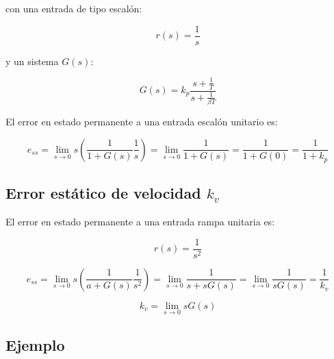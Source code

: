             con una entrada de tipo escalón:

            \begin{equation*}
                r(s) = \frac{1}{s}
            \end{equation*}

            y un sistema $G(s)$:

            \begin{equation*}
                G(s) = k_p \frac{s + \frac{1}{T}}{s + \frac{1}{\beta T}}
            \end{equation*}

            El error en estado permanente a una entrada escalón unitario es:

            \begin{equation*}
                e_{ss} = \lim_{s \to 0} s \left( \frac{1}{1 + G(s)} \frac{1}{s} \right) = \lim_{s \to 0} \frac{1}{1 + G(s)} = \frac{1}{1 + G(0)} = \frac{1}{1 + k_p}
            \end{equation*}


        \subsection{Error estático de velocidad $k_v$}
            El error en estado permanente a una entrada rampa unitaria es:

            \begin{equation*}
                r(s) = \frac{1}{s^2}
            \end{equation*}

            \begin{equation*}
                e_{ss} = \lim_{s \to 0} s \left( \frac{1}{a + G(s)} \frac{1}{s^2} \right) = \lim_{s \to 0} \frac{1}{s + s G(s)} = \lim_{s \to 0} \frac{1}{s G(s)} = \frac{1}{k_v}
            \end{equation*}

            \begin{equation*}
                k_v = \lim_{s \to 0} s G(s)
            \end{equation*}


        \subsection{Ejemplo}
